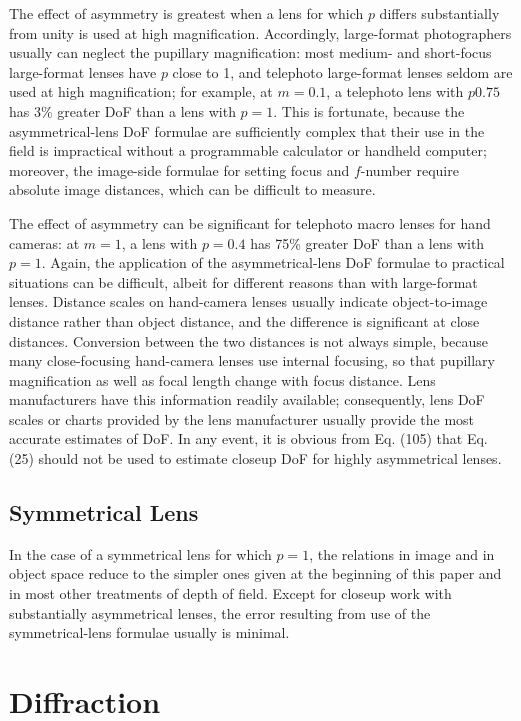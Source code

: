 \documentclass[11pt, oneside]{scrartcl}   	%
\begin{document}
The effect of asymmetry is greatest when a lens for which $p$ differs substantially from unity is used at high magnification. Accordingly, large-format photographers usually can neglect the pupillary magnification: most medium- and short-focus large-format lenses have $p$ close to 1, and telephoto large-format lenses seldom are used at high magnification; for example, at $m = 0.1$, a telephoto lens with $p  0.75$ has 3\% greater DoF than a lens with $p = 1$. This is fortunate, because the asymmetrical-lens DoF formulae are sufficiently complex that their use in the field is impractical without a programmable calculator or handheld computer; moreover, the image-side formulae for setting focus and $f$-number require absolute image distances, which can be difficult to measure.

The effect of asymmetry can be significant for telephoto macro lenses for hand cameras: at $m = 1$, a lens with $p = 0.4$ has 75\% greater DoF than a lens with $p = 1$. Again, the application of the asymmetrical-lens DoF formulae to practical situations can be difficult, albeit for different reasons than with large-format lenses. Distance scales on hand-camera lenses usually indicate object-to-image distance rather than object distance, and the difference is significant at close distances. Conversion between the two distances is not always simple, because many close-focusing hand-camera lenses use internal focusing, so that pupillary magnification as well as focal length change with focus distance. Lens manufacturers have this information readily available; consequently, lens DoF scales or charts provided by the lens manufacturer usually provide the most accurate estimates of DoF. In any event, it is obvious from Eq. (105) that Eq. (25) should not be used to estimate closeup DoF for highly asymmetrical lenses.

\subsection{Symmetrical Lens}

In the case of a symmetrical lens for which $p = 1$, the relations in image and in object space reduce to the simpler ones given at the beginning of this paper and in most other treatments of depth of field. Except for closeup work with substantially asymmetrical lenses, the error resulting from use of the symmetrical-lens formulae usually is minimal.

\section{Diffraction}
\label{sec:diffraction}
\end{document}
